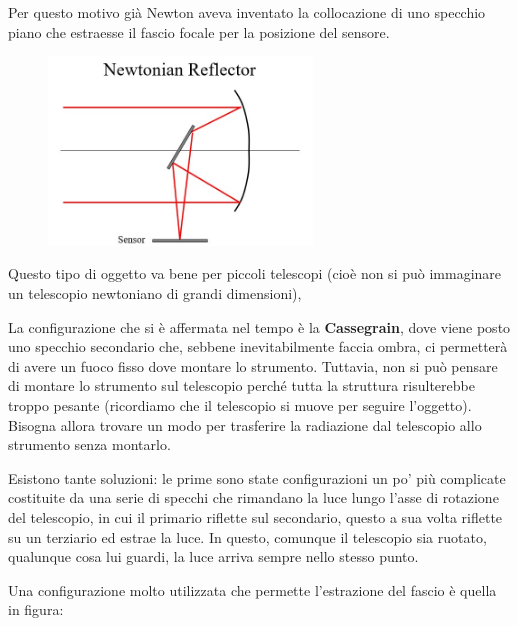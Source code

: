 Per questo motivo già Newton aveva inventato la collocazione di uno specchio piano che estraesse il fascio focale per la posizione del sensore.

\begin{figure}[H]
        \centering
        \includegraphics[width=7cm]{13.jpg}
        \label{}
    \end{figure}

Questo tipo di oggetto va bene per piccoli telescopi (cioè non si può immaginare un telescopio newtoniano di grandi dimensioni),

La configurazione che si è affermata nel tempo è la \textbf{Cassegrain}, dove viene posto uno specchio secondario che, sebbene inevitabilmente faccia ombra, ci permetterà di avere un fuoco fisso dove montare lo strumento. Tuttavia, non si può pensare di montare lo strumento sul telescopio perché tutta la struttura risulterebbe troppo pesante (ricordiamo che il telescopio si muove per seguire l'oggetto).
Bisogna allora trovare un modo per trasferire la radiazione dal telescopio allo strumento senza montarlo.

Esistono tante soluzioni: le prime sono state configurazioni un po' più complicate costituite da una serie di specchi che rimandano la luce lungo l'asse di rotazione del telescopio, in cui il primario riflette sul secondario, questo a sua volta riflette su un terziario ed estrae la luce. In questo, comunque il telescopio sia ruotato, qualunque cosa lui guardi, la luce arriva sempre nello stesso punto.

Una configurazione molto utilizzata che permette l'estrazione del fascio è quella in figura:

